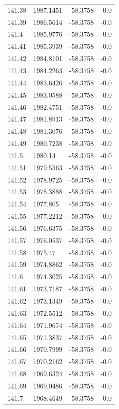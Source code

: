 \begin{table}[H]
\begin{tabular}{llll}
141.38 & 1987.1451 & -58.3758 & -0.0 \\
141.39 & 1986.5614 & -58.3758 & -0.0 \\
141.4 & 1985.9776 & -58.3758 & -0.0 \\
141.41 & 1985.3939 & -58.3758 & -0.0 \\
141.42 & 1984.8101 & -58.3758 & -0.0 \\
141.43 & 1984.2263 & -58.3758 & -0.0 \\
141.44 & 1983.6426 & -58.3758 & -0.0 \\
141.45 & 1983.0588 & -58.3758 & -0.0 \\
141.46 & 1982.4751 & -58.3758 & -0.0 \\
141.47 & 1981.8913 & -58.3758 & -0.0 \\
141.48 & 1981.3076 & -58.3758 & -0.0 \\
141.49 & 1980.7238 & -58.3758 & -0.0 \\
141.5 & 1980.14 & -58.3758 & -0.0 \\
141.51 & 1979.5563 & -58.3758 & -0.0 \\
141.52 & 1978.9725 & -58.3758 & -0.0 \\
141.53 & 1978.3888 & -58.3758 & -0.0 \\
141.54 & 1977.805 & -58.3758 & -0.0 \\
141.55 & 1977.2212 & -58.3758 & -0.0 \\
141.56 & 1976.6375 & -58.3758 & -0.0 \\
141.57 & 1976.0537 & -58.3758 & -0.0 \\
141.58 & 1975.47 & -58.3758 & -0.0 \\
141.59 & 1974.8862 & -58.3758 & -0.0 \\
141.6 & 1974.3025 & -58.3758 & -0.0 \\
141.61 & 1973.7187 & -58.3758 & -0.0 \\
141.62 & 1973.1349 & -58.3758 & -0.0 \\
141.63 & 1972.5512 & -58.3758 & -0.0 \\
141.64 & 1971.9674 & -58.3758 & -0.0 \\
141.65 & 1971.3837 & -58.3758 & -0.0 \\
141.66 & 1970.7999 & -58.3758 & -0.0 \\
141.67 & 1970.2162 & -58.3758 & -0.0 \\
141.68 & 1969.6324 & -58.3758 & -0.0 \\
141.69 & 1969.0486 & -58.3758 & -0.0 \\
141.7 & 1968.4649 & -58.3758 & -0.0 \\

\end{tabular}
\end{table}
